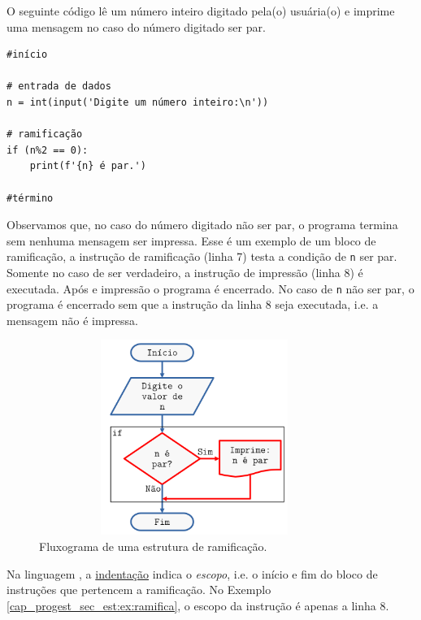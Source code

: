 \begin{ex}\label{cap_progest_sec_est:ex:ramifica}
  O seguinte código lê um número inteiro digitado pela(o) usuária(o) e imprime uma mensagem no caso do número digitado ser par.

\begin{lstlisting}
#início

# entrada de dados
n = int(input('Digite um número inteiro:\n'))

# ramificação
if (n%2 == 0):
    print(f'{n} é par.')

#término
\end{lstlisting}

Observamos que, no caso do número digitado não ser par, o programa termina sem nenhuma mensagem ser impressa. Esse é um exemplo de um bloco de ramificação, a instrução de ramificação (linha 7) testa a condição de \lstinline+n+ ser par. Somente no caso de ser verdadeiro, a instrução de impressão (linha 8) é executada. Após e impressão o programa é encerrado. No caso de \lstinline+n+ não ser par, o programa é encerrado sem que a instrução da linha 8 seja executada, i.e. a mensagem não é impressa.

\begin{figure}[H]
  \centering
  \includegraphics[max width=0.9\textwidth, max height=2.5in]{./cap_progest/dados/fig_fg_ramifica/fig.png}
  \caption{Fluxograma de uma estrutura de ramificação.}
  \label{cap_progest:fig:fg_ramifica}
\end{figure}
  
\end{ex}

\begin{obs}
  Na linguagem {\python}, a \href{https://pt.wikipedia.org/wiki/Indenta\%C3\%A7\%C3\%A3o}{indentação} indica o \emph{escopo}, i.e. o início e fim do bloco de instruções que pertencem a ramificação. No Exemplo \ref{cap_progest_sec_est:ex:ramifica}, o escopo da instrução {\PYTHONif} é apenas a linha 8.
\end{obs}

